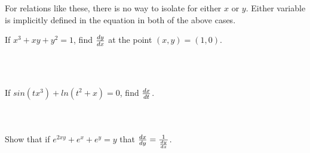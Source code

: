 For relations like these, there is no way to isolate for either $ x $ or $ y $. Either variable is implicitly defined in the equation in both of the above cases. \\

\begin{exercise}\nonumber
    If $ x^3 + xy + y^2 = 1 $, find $ dy \over dx $ at the point $ (x, y) = (1, 0) $. \\

    \begin{align}
        \\
        \\
        \\
        \\
        \\
        \\
        \\
        \\
    \end{align}
\end{exercise}

\begin{exercise}\nonumber
    If $ sin(tx^3) + ln(t^2 + x) = 0 $, find $ dx \over dt $. \\

    \begin{align}
        \\
        \\
        \\
        \\
        \\
        \\
    \end{align}
\end{exercise}

\begin{exercise}\nonumber
    Show that if $ e^{2xy} +e^x + e^y = y $ that $ {dx \over dy} = {1 \over {dy \over dx}} $. \\

    \begin{align}
        \\
        \\
        \\
        \\
        \\
        \\
        \\
        \\
        \\
        \\
        \\
        \\
        \\
        \\
        \\
        \\
    \end{align}
\end{exercise}

